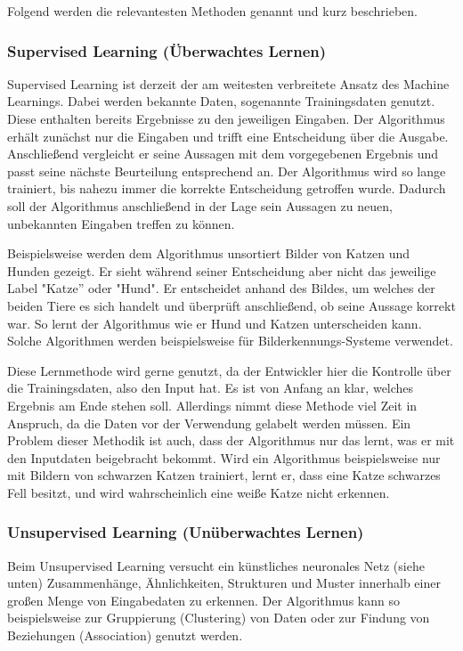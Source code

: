 \documentclass[a4paper,12pt, german]{report}
\begin{document}
Folgend werden die relevantesten Methoden genannt und kurz beschrieben. \cite{10}

\subsubsection{Supervised Learning (Überwachtes Lernen)} 

Supervised Learning ist derzeit der am weitesten verbreitete Ansatz des Machine Learnings. Dabei werden bekannte Daten, sogenannte Trainingsdaten genutzt. Diese enthalten bereits Ergebnisse zu den jeweiligen Eingaben. Der Algorithmus erhält zunächst nur die Eingaben und trifft eine Entscheidung über die Ausgabe. Anschließend vergleicht er seine Aussagen mit dem vorgegebenen Ergebnis und passt seine nächste Beurteilung entsprechend an. Der Algorithmus wird so lange trainiert, bis nahezu immer die korrekte Entscheidung getroffen wurde. Dadurch soll der Algorithmus anschließend in der Lage sein Aussagen zu neuen, unbekannten Eingaben treffen zu können.\cite{01}\cite{05}

Beispielsweise werden dem Algorithmus unsortiert Bilder von Katzen und Hunden gezeigt. Er sieht während seiner Entscheidung aber nicht das jeweilige Label "Katze'' oder "Hund". Er entscheidet anhand des Bildes, um welches der beiden Tiere es sich handelt und überprüft anschließend, ob seine Aussage korrekt war. So lernt der Algorithmus wie er Hund und Katzen unterscheiden kann. Solche Algorithmen werden beispielsweise für Bilderkennungs-Systeme verwendet. 

Diese Lernmethode wird gerne genutzt, da der Entwickler hier die Kontrolle über die Trainingsdaten, also den Input hat. Es ist von Anfang an klar, welches Ergebnis am Ende stehen soll. Allerdings nimmt diese Methode viel Zeit in Anspruch, da die Daten vor der Verwendung gelabelt werden müssen. Ein Problem dieser Methodik ist auch, dass der Algorithmus nur das lernt, was er mit den Inputdaten beigebracht bekommt. Wird ein Algorithmus beispielsweise nur mit Bildern von schwarzen Katzen trainiert, lernt er, dass eine Katze schwarzes Fell besitzt, und wird wahrscheinlich eine weiße Katze nicht erkennen.

\subsubsection{Unsupervised Learning (Unüberwachtes Lernen)} 

Beim Unsupervised Learning versucht ein künstliches neuronales Netz (siehe unten) Zusammenhänge, Ähnlichkeiten, Strukturen und Muster innerhalb einer großen Menge von Eingabedaten zu erkennen. Der Algorithmus kann so beispielsweise zur Gruppierung (Clustering) von Daten oder zur Findung von Beziehungen (Association) genutzt werden.\cite{01}
\end{document}

